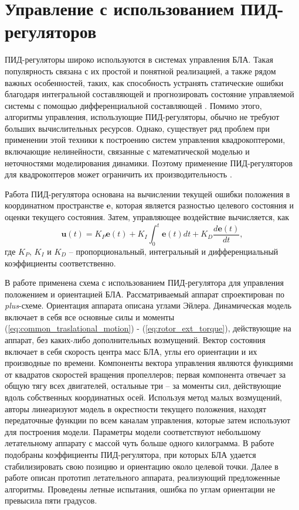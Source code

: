 \section{Управление с использованием ПИД-регуляторов}

ПИД-регуляторы широко используются в системах управления БЛА.
Такая популярность связана с их простой и понятной реализацией, а также рядом важных особенностей, таких, как способность устранять статические ошибки благодаря интегральной составляющей и прогнозировать состояние управляемой системы с помощью дифференциальной составляющей  \cite{Astrom01}.
Помимо этого, алгоритмы управления, использующие ПИД-регуляторы, обычно не требуют больших вычислительных ресурсов.
Однако, существует ряд проблем при применении этой техники к построению систем управления квадрокоптероми, включающие нелинейности, связанные с математической моделью и неточностями моделирования динамики.
Поэтому применение ПИД-регуляторов для квадрокоптеров может ограничить их производительность \cite{Zulu01}.

Работа ПИД-регулятора основана на вычислении текущей ошибки положения в координатном пространстве $\bm{e}$, которая является разностью целевого состояния и оценки текущего состояния. Затем, управляющее воздействие вычисляется, как
\begin{equation} \label{eq:pid_common}
\bm{u}(t) = K_P \bm{e}(t) + K_I\int_0^t \bm{e}(t) dt + K_D \frac{d\bm{e}(t)}{dt},
\end{equation}
где $K_P$, $K_I$ и $K_D$ -- пропорциональный, интегральный и дифференциальный коэффициенты соответственно.

В работе \cite{Li01} применена схема с использованием ПИД-регулятора для управления положением и ориентацией БЛА.
Рассматриваемый аппарат спроектирован по \textit{plus}-схеме.
Ориентация аппарата описана углами Эйлера.
Динамическая модель включает в себя все основные силы и моменты (\ref{eq:common_traslational_motion}) - (\ref{eq:rotor_ext_torque}), действующие на аппарат, без каких-либо дополнительных возмущений.
Вектор состояния включает в себя скорость центра масс БЛА, углы его ориентации и их производные по времени.
Компоненты вектора управления являются функциями от квадратов скоростей вращения пропеллеров; первая компонента отвечает за общую тягу всех двигателей, остальные три -- за моменты сил, действующие вдоль собственных координатных осей.
Используя метод малых возмущений, авторы линеаризуют модель в окрестности текущего положения, находят передаточные функции по всем каналам управления, которые затем используют для построения модели.
Параметры модели соответствуют небольшому летательному аппарату с массой чуть больше одного килограмма.
В работе подобраны коэффициенты ПИД-регулятора, при которых БЛА удается стабилизировать свою позицию и ориентацию около целевой точки.
Далее в работе описан прототип летательного аппарата, реализующий предложенные алгоритмы.
Проведены летные испытания, ошибка по углам ориентации не превысила пяти градусов.


